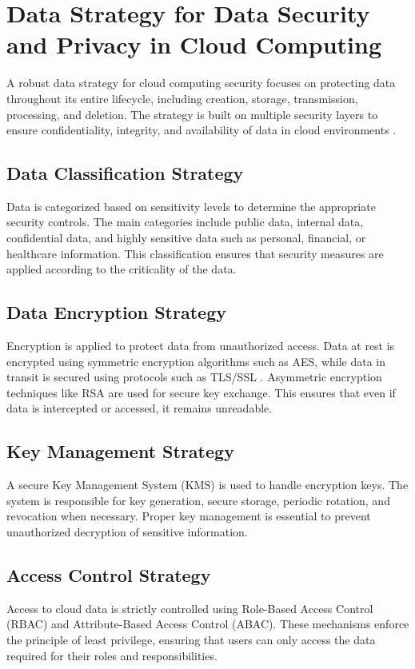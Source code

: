 \documentclass[12pt, a4paper]{article}
\begin{document}
\section{Data Strategy for Data Security and Privacy in Cloud Computing}

A robust data strategy for cloud computing security focuses on protecting data throughout its entire lifecycle, including creation, storage, transmission, processing, and deletion. The strategy is built on multiple security layers to ensure confidentiality, integrity, and availability of data in cloud environments \cite{iso27001}.

\subsection{Data Classification Strategy}
Data is categorized based on sensitivity levels to determine the appropriate security controls. The main categories include public data, internal data, confidential data, and highly sensitive data such as personal, financial, or healthcare information. This classification ensures that security measures are applied according to the criticality of the data.

\subsection{Data Encryption Strategy}
Encryption is applied to protect data from unauthorized access. Data at rest is encrypted using symmetric encryption algorithms such as AES, while data in transit is secured using protocols such as TLS/SSL \cite{fernandes2014securitycloud}. Asymmetric encryption techniques like RSA are used for secure key exchange. This ensures that even if data is intercepted or accessed, it remains unreadable.

\subsection{Key Management Strategy}
A secure Key Management System (KMS) is used to handle encryption keys. The system is responsible for key generation, secure storage, periodic rotation, and revocation when necessary. Proper key management is essential to prevent unauthorized decryption of sensitive information.

\subsection{Access Control Strategy}
Access to cloud data is strictly controlled using Role-Based Access Control (RBAC) and Attribute-Based Access Control (ABAC). These mechanisms enforce the principle of least privilege, ensuring that users can only access the data required for their roles and responsibilities.
\end{document}
